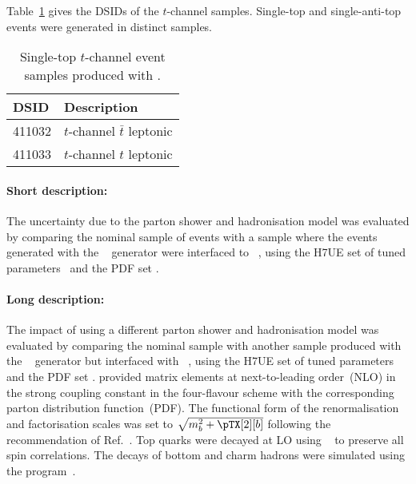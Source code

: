 Table~\ref{tab:tchan_PH7} gives the DSIDs of the $t$-channel \POWHER[7] samples.
Single-top and single-anti-top events were generated in distinct samples.

\begin{table}[htbp]
  \caption{Single-top $t$-channel event samples produced with \POWHER[7].}%
  \label{tab:tchan_PH7}
  \centering
  \begin{tabular}{l l}
    \toprule
    DSID & Description \\
    \midrule
    411032 & $t$-channel $\bar t$ leptonic \\
    411033 & $t$-channel $t$ leptonic \\
    \bottomrule
  \end{tabular}
\end{table}

\paragraph{Short description:}

The uncertainty due to the parton shower and hadronisation model was
evaluated by comparing the nominal sample of events with a sample where
the events generated with the
\POWHEGBOX[v2]~\cite{Frederix:2012dh,Nason:2004rx,Frixione:2007vw,Alioli:2010xd}
generator were interfaced to
\HERWIG[7.04]~\cite{Bahr:2008pv,Bellm:2015jjp}, using the H7UE set
of tuned parameters~\cite{Bellm:2015jjp} and the \MMHT[lo] PDF set
\cite{Harland-Lang:2014zoa}.


\paragraph{Long description:}

The impact of using a different parton shower and hadronisation model was evaluated by comparing the nominal sample
with another sample produced with the \POWHEGBOX[v2]~\cite{Frederix:2012dh,Nason:2004rx,Frixione:2007vw,Alioli:2010xd}
generator but interfaced with \HERWIG[7.04]~\cite{Bahr:2008pv,Bellm:2015jjp}, using the H7UE set of
tuned parameters~\cite{Bellm:2015jjp} and the \MMHT[lo] PDF set \cite{Harland-Lang:2014zoa}.
\POWHEGBOX provided matrix elements at next-to-leading order~(NLO) in the strong coupling constant \alphas
in the four-flavour scheme with the corresponding \NNPDF[3.0nlo]~\cite{Ball:2014uwa} parton distribution function~(PDF).
The functional form of the renormalisation and factorisation scales was set to $\sqrt{m_b^2 + \pTX[2][b]}$
following the recommendation of Ref.~\cite{Frederix:2012dh}.
Top quarks were decayed at LO using \MADSPIN~\cite{Frixione:2007zp,Artoisenet:2012st} to preserve all spin correlations.
The decays of bottom and charm hadrons were simulated using the \EVTGEN[1.6.0] program~\cite{Lange:2001uf}.


